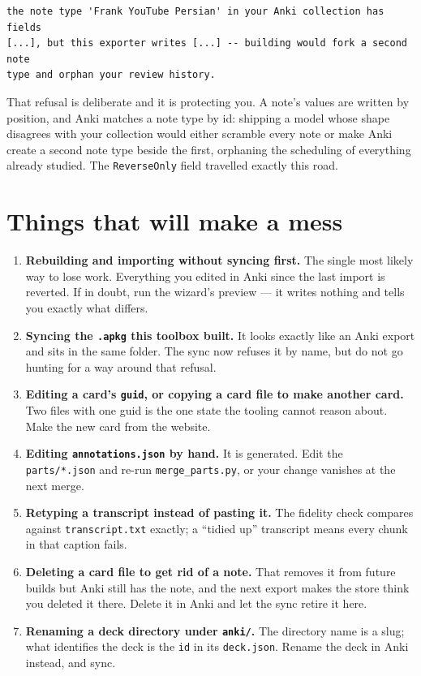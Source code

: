 \documentclass[11pt,oneside]{report}
\newcommand{\file}[1]{\texttt{#1}}
\begin{document}
\begin{lstlisting}
the note type 'Frank YouTube Persian' in your Anki collection has fields
[...], but this exporter writes [...] -- building would fork a second note
type and orphan your review history.
\end{lstlisting}

That refusal is deliberate and it is protecting you. A note's values are
written by position, and Anki matches a note type by id: shipping a model
whose shape disagrees with your collection would either scramble every note
or make Anki create a second note type beside the first, orphaning the
scheduling of everything already studied. The \texttt{ReverseOnly} field
travelled exactly this road.

\section{Things that will make a mess}

\begin{badbox}
\begin{enumerate}
\item \textbf{Rebuilding and importing without syncing first.} The single
  most likely way to lose work. Everything you edited in Anki since the last
  import is reverted. If in doubt, run the wizard's preview --- it writes
  nothing and tells you exactly what differs.

\item \textbf{Syncing the \file{.apkg} this toolbox built.} It looks exactly
  like an Anki export and sits in the same folder. The sync now refuses it
  by name, but do not go hunting for a way around that refusal.

\item \textbf{Editing a card's \texttt{guid}, or copying a card file to make
  another card.} Two files with one guid is the one state the tooling cannot
  reason about. Make the new card from the website.

\item \textbf{Editing \file{annotations.json} by hand.} It is generated.
  Edit the \file{parts/*.json} and re-run \file{merge\_parts.py}, or your
  change vanishes at the next merge.

\item \textbf{Retyping a transcript instead of pasting it.} The fidelity
  check compares against \file{transcript.txt} exactly; a ``tidied up''
  transcript means every chunk in that caption fails.

\item \textbf{Deleting a card file to get rid of a note.} That removes it
  from future builds but Anki still has the note, and the next export makes
  the store think you deleted it there. Delete it in Anki and let the sync
  retire it here.

\item \textbf{Renaming a deck directory under \file{anki/}.} The directory
  name is a slug; what identifies the deck is the \texttt{id} in its
  \file{deck.json}. Rename the deck in Anki instead, and sync.
\end{enumerate}
\end{badbox}
\end{document}

